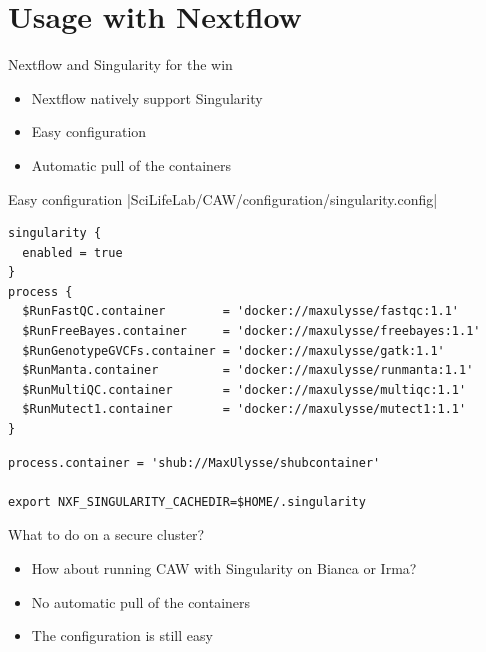 \documentclass{beamer}
\begin{document}
\section{Usage with Nextflow}

\begin{frame}{Nextflow and Singularity for the win}
	\vspace{-3cm}
	\begin{itemize}
		\item Nextflow natively support Singularity
		\pause
		\item Easy configuration
		\pause
		\item Automatic pull of the containers
	\end{itemize}
\end{frame}

\begin{frame}[fragile]{Easy configuration}
|SciLifeLab/CAW/configuration/singularity.config|
\begin{verbatim}
singularity {
  enabled = true
}
process {
  $RunFastQC.container        = 'docker://maxulysse/fastqc:1.1'
  $RunFreeBayes.container     = 'docker://maxulysse/freebayes:1.1'
  $RunGenotypeGVCFs.container = 'docker://maxulysse/gatk:1.1'
  $RunManta.container         = 'docker://maxulysse/runmanta:1.1'
  $RunMultiQC.container       = 'docker://maxulysse/multiqc:1.1'
  $RunMutect1.container       = 'docker://maxulysse/mutect1:1.1'
}

\end{verbatim}
\pause
\begin{verbatim}
process.container = 'shub://MaxUlysse/shubcontainer'

export NXF_SINGULARITY_CACHEDIR=$HOME/.singularity
\end{verbatim}
\end{frame}

\begin{frame}{What to do on a secure cluster?}
	\begin{itemize}
		\item How about running CAW with Singularity on Bianca or Irma?
		\pause
		\item No automatic pull of the containers
		\pause
		\item The configuration is still easy
	\end{itemize}
\end{frame}
\end{document}
